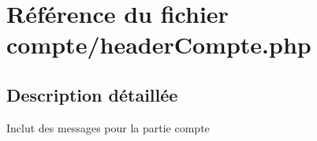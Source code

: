 \hypertarget{headerCompte_8php}{}\section{Référence du fichier compte/header\+Compte.php}
\label{headerCompte_8php}


\subsection{Description détaillée}
Inclut des messages pour la partie compte 